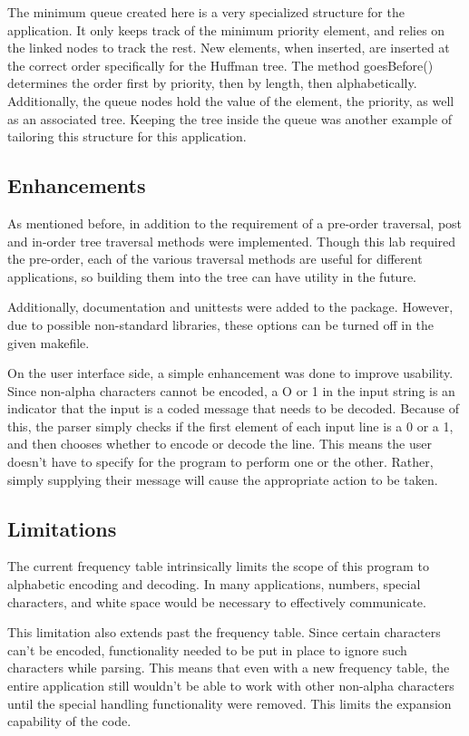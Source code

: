 \documentclass[a4paper,12pt]{article}
\begin{document}
The minimum queue created here is a very specialized structure for the application.  It only keeps track of the minimum priority element, and relies on the linked nodes to track the rest.  New elements, when inserted, are inserted at the correct order specifically for the Huffman tree.  The method goesBefore() determines the order first by priority, then by length, then alphabetically.  Additionally, the queue nodes hold the value of the element, the priority, as well as an associated tree.  Keeping the tree inside the queue was another example of tailoring this structure for this application.

\subsection{Enhancements}
As mentioned before, in addition to the requirement of a pre-order traversal, post and in-order tree traversal methods were implemented.  Though this lab required the pre-order, each of the various traversal methods are useful for different applications, so building them into the tree can have utility in the future.

Additionally, documentation and unittests were added to the package.  However, due to possible non-standard libraries, these options can be turned off in the given makefile.

On the user interface side, a simple enhancement was done to improve usability.  Since non-alpha characters cannot be encoded, a O or 1 in the input string is an indicator that the input is a coded message that needs to be decoded.  Because of this, the parser simply checks if the first element of each input line is a 0 or a 1, and then chooses whether to encode or decode the line.  This means the user doesn't have to specify for the program to perform one or the other.  Rather, simply supplying their message will cause the appropriate action to be taken.


\subsection{Limitations}
The current frequency table intrinsically limits the scope of this program to alphabetic encoding and decoding.  In many applications, numbers, special characters, and white space would be necessary to effectively communicate. 

This limitation also extends past the frequency table.  Since certain characters can't be encoded, functionality needed to be put in place to ignore such characters while parsing.  This means that even with a new frequency table, the entire application still wouldn't be able to work with other non-alpha characters until the special handling functionality were removed.  This limits the expansion capability of the code.
\end{document}
